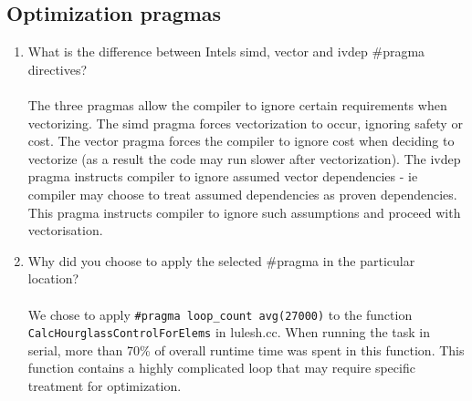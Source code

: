 \documentclass{article}
\begin{document}
\subsection{Optimization pragmas}
\begin{enumerate}
\item{What is the difference between Intels simd, vector and ivdep \#pragma directives?}\\\\
The three pragmas allow the compiler to ignore certain requirements when vectorizing. The simd pragma forces vectorization to occur, ignoring safety or cost. The vector pragma forces the compiler to ignore cost when deciding to vectorize (as a result the code may run slower after vectorization). The ivdep pragma instructs compiler to ignore assumed vector dependencies - ie compiler may choose to treat assumed dependencies as proven dependencies. This pragma instructs compiler to ignore such assumptions and proceed with vectorisation.
\item{Why did you choose to apply the selected \#pragma in the particular location?}\\\\
We chose to apply \verb!#pragma loop_count avg(27000)! to the function \verb!CalcHourglassControlForElems! in lulesh.cc. When running the task in serial, more than 70\% of overall runtime time was spent in this function. This function contains a highly complicated loop that may require specific treatment for optimization.
\end{enumerate}
\end{document}

